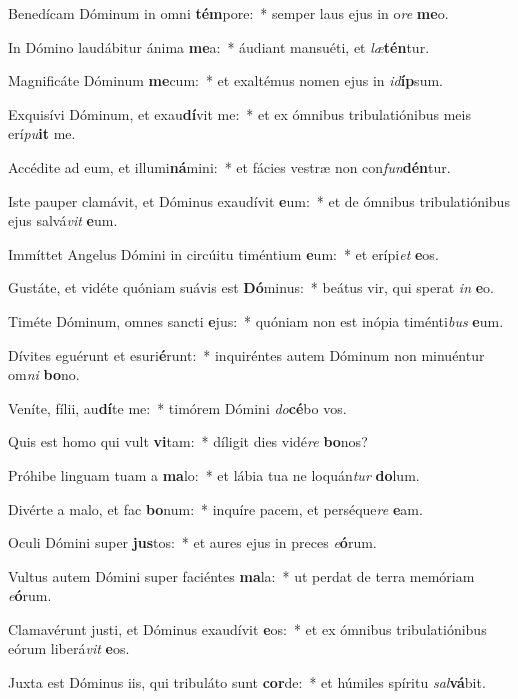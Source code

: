 \item Benedícam Dóminum in omni \textbf{tém}pore:~* semper laus ejus in o\textit{re} \textbf{me}o.
\item In Dómino laudábitur ánima \textbf{me}a:~* áudiant mansuéti, et \textit{læ}\textbf{tén}tur.
\item Magnificáte Dóminum \textbf{me}cum:~* et exaltémus nomen ejus in \textit{id}\textbf{íp}sum.
\item Exquisívi Dóminum, et exau\textbf{dí}vit me:~* et ex ómnibus tribulatiónibus meis erí\textit{pu}\textbf{it} me.
\item Accédite ad eum, et illumi\textbf{ná}mini:~* et fácies vestræ non con\textit{fun}\textbf{dén}tur.
\item Iste pauper clamávit, et Dóminus exaudívit \textbf{e}um:~* et de ómnibus tribulatiónibus ejus salvá\textit{vit} \textbf{e}um.
\item Immíttet Angelus Dómini in circúitu timéntium \textbf{e}um:~* et erípi\textit{et} \textbf{e}os.
\item Gustáte, et vidéte quóniam suávis est \textbf{Dó}minus:~* beátus vir, qui sperat \textit{in} \textbf{e}o.
\item Timéte Dóminum, omnes sancti \textbf{e}jus:~* quóniam non est inópia timénti\textit{bus} \textbf{e}um.
\item Dívites eguérunt et esuri\textbf{é}\-runt:~* inquiréntes autem Dóminum non minuéntur om\textit{ni} \textbf{bo}no.
\item Veníte, fílii, au\textbf{dí}te me:~* timórem Dómini \textit{do}\textbf{cé}bo vos.
\item Quis est homo qui vult \textbf{vi}tam:~* díligit dies vidé\textit{re} \textbf{bo}nos?
\item Próhibe linguam tuam a \textbf{ma}lo:~* et lábia tua ne loquán\textit{tur} \textbf{do}lum.
\item Divérte a malo, et fac \textbf{bo}num:~* inquíre pacem, et perséque\textit{re} \textbf{e}am.
\item Oculi Dómini super \textbf{jus}tos:~* et aures ejus in preces \textit{e}\textbf{ó}rum.
\item Vultus autem Dómini super faciéntes \textbf{ma}la:~* ut perdat de terra memóriam \textit{e}\textbf{ó}rum.
\item Clamavérunt justi, et Dóminus exaudívit \textbf{e}os:~* et ex ómnibus tribulatiónibus eórum liberá\textit{vit} \textbf{e}os.
\item Juxta est Dóminus iis, qui tribuláto sunt \textbf{cor}de:~* et húmiles spíritu \textit{sal}\textbf{vá}bit.
